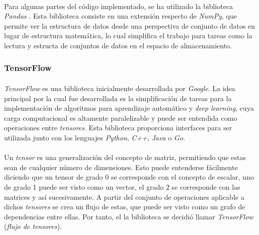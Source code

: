 \documentclass{subfiles}
\begin{document}
          \paragraph{}
          Para algunas partes del código implementado, se ha utilizado la biblioteca \emph{Pandas} \cite{mckinney2010data}. Esta biblioteca consiste en una extensión respecto de \emph{NumPy}, que permite ver la estructura de datos desde una perspectiva de conjunto de datos en lugar de estructura matemática, lo cual simplifica el trabajo para tareas como la lectura y estructa de conjuntos de datos en el espacio de almacenamiento.

        \subsubsection{TensorFlow}
        \label{sec:tensorflow}

          \paragraph{}
          \emph{TensorFlow} \cite{abadi2016tensorflow} es una biblioteca inicialmente desarrollada por \emph{Google}. La idea principal por la cual fue desarrollada es la simplificación de tareas para la implementación de algoritmos para aprendizaje automático y \emph{deep learning}, cuya carga computacional es altamente paralelizable y puede ser entendida como operaciones entre \emph{tensores}. Esta biblioteca proporciona interfaces para ser utilizada junto con los lenguajes \emph{Python}, \emph{C++}, \emph{Java} o \emph{Go}.

          \paragraph{}
          Un \emph{tensor} es una generalización del concepto de matriz, permitiendo que estas sean de cualquier número de dimensiones. Esto puede entenderse fácilmente diciendo que un tensor de grado 0 se corresponde con el concepto de escalar, uno de grado 1 puede ser visto como un vector, el grado 2 se corresponde con las matrices y así sucesivamente. A partir del conjunto de operaciones aplicable a dichos \emph{tensores} se crea un flujo de estas, que puede ser visto como un grafo de dependencias entre ellas. Por tanto, el la biblioteca se decidió llamar \emph{TensorFlow} (\emph{flujo de tensores}).
\end{document}
